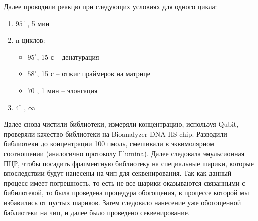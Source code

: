 Далее проводили реакцю при следующих условиях для одного цикла:

\begin{enumerate}
	\item $95^{\circ}$ , 5 мин 
	\item n циклов:
	\begin{itemize}
		\item $95^{\circ}$, 15 с – денатурация
		\item $58^{\circ}$, 15 с – отжиг праймеров на матрице
		\item $70^{\circ}$, 1 мин – элонгация
	\end{itemize}
	\item $4^{\circ}$ ,  $\infty$
\end{enumerate}

Далее снова чистили библиотеки, измеряли концентрацию, используя Qubit, проверяли качество библиотеки на Bioanalyzer DNA HS chip. Разводили библиотеки до концентрации 100 пмоль, смешивали в эквимолярном соотношении (аналогично протоколу Illumina). Далее следовала эмульсионная ПЦР, чтобы посадить фрагментную библиотеку на специальные шарики, которые впоследствии будут нанесены на чип для секвенирования. Так как данный процесс имеет погрешность, то есть не все шарики оказываются связанными с бибилотекой, то была проведена процедура обогощения, в процессе которой мы избавились от пустых шариков. Затем следовало нанесение уже обогощенной баблиотеки на чип, и далее было проведено секвенирование. 

\clearpage
